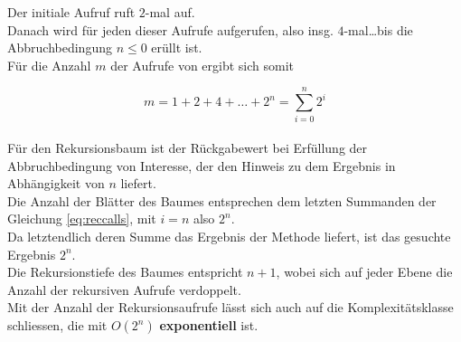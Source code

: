 \noindent
Der initiale Aufruf  ruft $2$-mal  auf.\\
Danach wird für jeden dieser Aufrufe  aufgerufen, also insg. $4$-mal\ldots bis die Abbruchbedingung $n \leq 0$ erüllt ist.\\
Für die Anzahl $m$ der Aufrufe von  ergibt sich somit


\begin{equation}
     m = 1 + 2 + 4 + \dots + 2^n = \sum_{i=0}^n 2^i
    \label{eq:reccalls}
\end{equation}\\

\noindent
Für den Rekursionsbaum ist der Rückgabewert bei Erfüllung der Abbruchbedingung von Interesse, der den Hinweis zu dem Ergebnis in Abhängigkeit von $n$ liefert.\\
Die Anzahl der Blätter des Baumes entsprechen dem letzten Summanden der Gleichung \ref{eq:reccalls}, mit $i=n$
also $2^n$.\\
Da letztendlich deren Summe das Ergebnis der Methode  liefert, ist das gesuchte Ergebnis $2^n$.\\

\noindent
Die Rekursionstiefe des Baumes entspricht $n + 1$, wobei sich auf jeder Ebene die Anzahl der rekursiven Aufrufe verdoppelt.\\
Mit der Anzahl der Rekursionsaufrufe lässt sich auch auf die Komplexitätsklasse schliessen, die mit $O(2^n)$ \textbf{exponentiell} ist.

